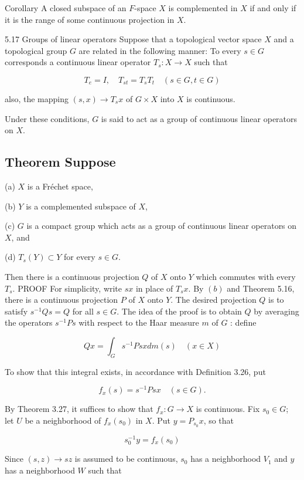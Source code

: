 \documentclass[10pt]{article}
\begin{document}
Corollary A closed subspace of an $F$-space $X$ is complemented in $X$ if and only if it is the range of some continuous projection in $X$.

5.17 Groups of linear operators Suppose that a topological vector space $X$ and a topological group $G$ are related in the following manner: To every $s \in G$ corresponds a continuous linear operator $T_{s}: X \rightarrow X$ such that

$$
T_{e}=I, \quad T_{s t}=T_{s} T_{t} \quad(s \in G, t \in G)
$$

also, the mapping $(s, x) \rightarrow T_{s} x$ of $G \times X$ into $X$ is continuous.

Under these conditions, $G$ is said to act as a group of continuous linear operators on $X$.

\subsection{Theorem Suppose}
(a) $X$ is a Fréchet space,

(b) $Y$ is a complemented subspace of $X$,

(c) $G$ is a compact group which acts as a group of continuous linear operators on $X$, and

(d) $T_{s}(Y) \subset Y$ for every $s \in G$.

Then there is a continuous projection $Q$ of $X$ onto $Y$ which commutes with every $T_{s}$. PROOF For simplicity, write $s x$ in place of $T_{s} x$. By $(b)$ and Theorem 5.16, there is a continuous projection $P$ of $X$ onto $Y$. The desired projection $Q$ is to satisfy $s^{-1} Q s=Q$ for all $s \in G$. The idea of the proof is to obtain $Q$ by averaging the operators $s^{-1} P s$ with respect to the Haar measure $m$ of $G$ : define

$$
Q x=\int_{G} s^{-1} P s x d m(s) \quad(x \in X)
$$

To show that this integral exists, in accordance with Definition 3.26, put

$$
f_{x}(s)=s^{-1} P s x \quad(s \in G) .
$$

By Theorem 3.27, it suffices to show that $f_{x}: G \rightarrow X$ is continuous. Fix $s_{0} \in G$; let $U$ be a neighborhood of $f_{x}\left(s_{0}\right)$ in $X$. Put $y=P_{s_{0}} x$, so that

$$
s_{0}^{-1} y=f_{x}\left(s_{0}\right)
$$

Since $(s, z) \rightarrow s z$ is assumed to be continuous, $s_{0}$ has a neighborhood $V_{1}$ and $y$ has a neighborhood $W$ such that
\end{document}

